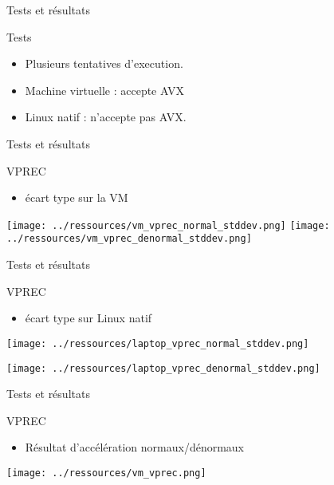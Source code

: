 \documentclass{beamer}
\begin{document}
\begin{frame}{Tests et résultats}

  \begin{block}{Tests}
 
        \begin{itemize}

            \item Plusieurs tentatives d'execution.
            \item Machine virtuelle : accepte AVX
            \item Linux natif : n'accepte pas AVX.
           
           
        \end{itemize}
  \end{block}
\end{frame}



\begin{frame}{Tests et résultats}
    \begin{block}{VPREC}
    \begin{itemize}
        \item écart type sur la VM 
    \end{itemize}
 \centering\texttt{[image: ../ressources/vm\_vprec\_normal\_stddev.png]}
  \centering\texttt{[image: ../ressources/vm\_vprec\_denormal\_stddev.png]}
    \end{block}
\end{frame}

\begin{frame}{Tests et résultats}
    \begin{block}{VPREC}
    \begin{itemize}
        \item écart type sur Linux natif
    \end{itemize}
 \centering\texttt{[image: ../ressources/laptop\_vprec\_normal\_stddev.png]}
 
  \centering\texttt{[image: ../ressources/laptop\_vprec\_denormal\_stddev.png]}
    \end{block}
\end{frame}



\begin{frame}{Tests et résultats}
    \begin{block}{VPREC}
    \begin{itemize}
        \item Résultat d'accélération normaux/dénormaux
    \end{itemize}
 \centering\texttt{[image: ../ressources/vm\_vprec.png]}
    \end{block}
\end{frame}
\end{document}
